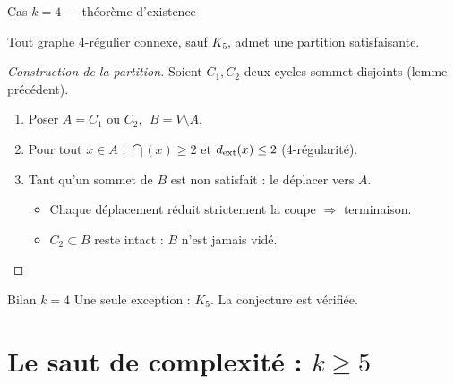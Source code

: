 \begin{frame}{Cas $k = 4$ --- th\'eor\`eme d'existence}
  \begin{theorem}
    Tout graphe 4-r\'egulier connexe, sauf $K_5$, admet une partition satisfaisante.
  \end{theorem}

  \begin{proof}[Construction de la partition]
    Soient $C_1, C_2$ deux cycles sommet-disjoints (lemme pr\'ec\'edent).
    \medskip
    \begin{enumerate}
      \item Poser $A = C_1 \text{ ou } C_2$, $\;B = V \setminus A$.
      \item Pour tout $x \in A$ : $\dint(x) \geq 2$ et $d_{\mathrm{ext}}(x) \leq 2$ (4-r\'egularit\'e).
      \item Tant qu'un sommet de $B$ est non satisfait : le d\'eplacer vers $A$.
        \begin{itemize}
          \item Chaque d\'eplacement r\'eduit strictement la coupe $\Rightarrow$ terminaison.
          \item $C_2 \subset B$ reste intact : $B$ n'est jamais vid\'e.
        \end{itemize}
    \end{enumerate}
  \end{proof}

  \begin{exampleblock}{Bilan $k = 4$}
    Une seule exception : $K_5$. La conjecture est v\'erifi\'ee.
  \end{exampleblock}
\end{frame}

\section{Le saut de complexit\'e : $k \geq 5$}

